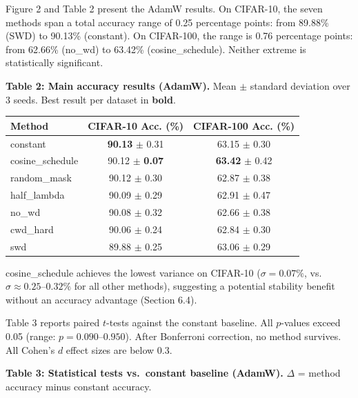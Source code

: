 \documentclass[
]{article}
\begin{document}
Figure 2 and Table 2 present the AdamW results. On CIFAR-10, the seven
methods span a total accuracy range of 0.25 percentage points: from
89.88\% (SWD) to 90.13\% (constant). On CIFAR-100, the range is 0.76
percentage points: from 62.66\% (no\_wd) to 63.42\% (cosine\_schedule).
Neither extreme is statistically significant.

\textbf{Table 2: Main accuracy results (AdamW).} Mean \(\pm\) standard
deviation over 3 seeds. Best result per dataset in \textbf{bold}.

\begin{longtable}[]{@{}lcc@{}}
\toprule\noalign{}
Method & CIFAR-10 Acc. (\%) & CIFAR-100 Acc. (\%) \\
\midrule\noalign{}
\endhead
\bottomrule\noalign{}
\endlastfoot
constant & \textbf{90.13} \(\pm\) 0.31 & 63.15 \(\pm\) 0.30 \\
cosine\_schedule & 90.12 \(\pm\) \textbf{0.07} & \textbf{63.42} \(\pm\)
0.42 \\
random\_mask & 90.12 \(\pm\) 0.30 & 62.87 \(\pm\) 0.38 \\
half\_lambda & 90.09 \(\pm\) 0.29 & 62.91 \(\pm\) 0.47 \\
no\_wd & 90.08 \(\pm\) 0.32 & 62.66 \(\pm\) 0.38 \\
cwd\_hard & 90.06 \(\pm\) 0.24 & 62.84 \(\pm\) 0.30 \\
swd & 89.88 \(\pm\) 0.25 & 63.06 \(\pm\) 0.29 \\
\end{longtable}

cosine\_schedule achieves the lowest variance on CIFAR-10
(\(\sigma = 0.07\%\), vs.~\(\sigma \approx 0.25\)--\(0.32\%\) for all
other methods), suggesting a potential stability benefit without an
accuracy advantage (Section 6.4).

Table 3 reports paired \(t\)-tests against the constant baseline. All
\(p\)-values exceed 0.05 (range: \(p = 0.090\)--\(0.950\)). After
Bonferroni correction, no method survives. All Cohen's \(d\) effect
sizes are below 0.3.

\textbf{Table 3: Statistical tests vs.~constant baseline (AdamW).}
\(\Delta\) = method accuracy minus constant accuracy.
\end{document}
